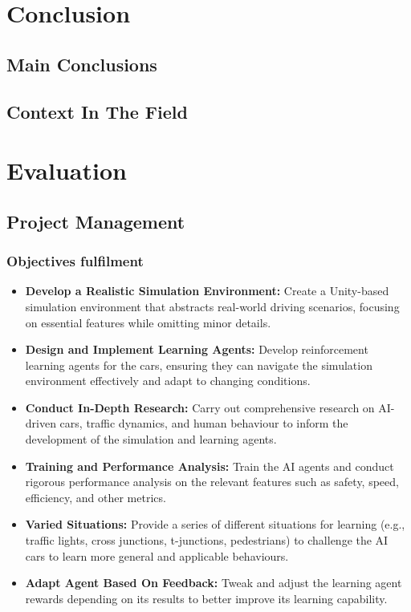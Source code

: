 \documentclass{article}
\begin{document}
\section{Conclusion}
\lipsum[2][1]

\subsection{Main Conclusions}
\subsection{Context In The Field}

\section{Evaluation}
\subsection{Project Management}
\lipsum[2][1]

\subsubsection{Objectives fulfilment}
\begin{itemize}
\item \textbf{Develop a Realistic Simulation Environment:} Create a Unity-based simulation environment that abstracts real-world driving scenarios, focusing on essential features while omitting minor details.

\item \textbf{Design and Implement Learning Agents:} Develop reinforcement learning agents for the cars, ensuring they can navigate the simulation environment effectively and adapt to changing conditions.

\item \textbf{Conduct In-Depth Research:} Carry out comprehensive research on AI-driven cars, traffic dynamics, and human behaviour to inform the development of the simulation and learning agents.

\item \textbf{Training and Performance Analysis:} Train the AI agents and conduct rigorous performance analysis on the relevant features such as safety, speed, efficiency, and other metrics.

\item \textbf{Varied Situations:} Provide a series of different situations for learning (e.g., traffic lights, cross junctions, t-junctions, pedestrians) to challenge the AI cars to learn more general and applicable behaviours.

\item \textbf{Adapt Agent Based On Feedback:} Tweak and adjust the learning agent rewards depending on its results to better improve its learning capability.

\end{itemize}
\end{document}
